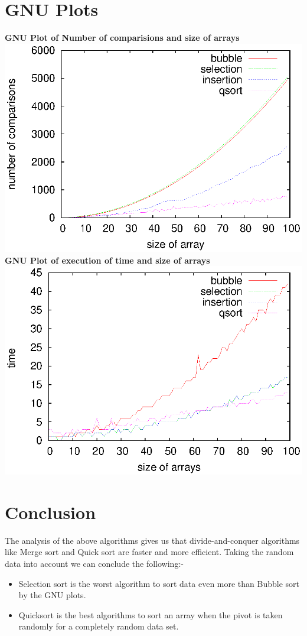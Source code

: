 \documentclass{IEEEtran}
\begin{document}
\section{GNU Plots}
\label{sec: plot}
\textbf{GNU Plot of Number of comparisions and size of arrays}
\includegraphics[scale=0.75]{noc.eps}
\textbf{GNU Plot of execution of time and size of arrays}
\includegraphics[scale=0.75]{time.eps}


\section{Conclusion}
\label{sec:conc}
The analysis of the above algorithms gives us that divide-and-conquer algorithms like Merge sort and Quick sort are faster and more efficient. Taking the random data into account we can conclude the following:-  
\begin{itemize}
\item Selection sort is the worst algorithm to sort data even more than Bubble sort by the GNU plots.
\item Quicksort is the best algorithms to sort an array when the pivot is taken randomly for a completely random data set.
\end{itemize}
\end{document}
